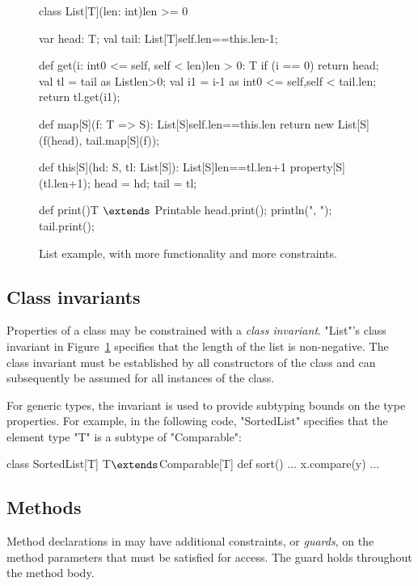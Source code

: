 \begin{figure}
{\footnotesize
\begin{xtenmathnoindent}
class List[T](len: int){len >= 0} {
  var head: T;
  val tail: List[T]{self.len==this.len-1};

  def get(i: int{0 <= self, self < len}){len > 0}: T {
    if (i == 0)
      return head;
    val tl = tail as List{len>0};
    val i1 = i-1 as int{0 <= self,self < tail.len};
    return tl.get(i1);
  }

  def map[S](f: T => S): List[S]{self.len==this.len} {
    return new List[S](f(head), tail.map[S](f));
  }

  def this[S](hd: S, tl: List[S]):
      List[S]{len==tl.len+1} {
    property[S](tl.len+1);
    head = hd; tail = tl;
  }

  def print(){T $\extends$ Printable} {
    head.print();
    println(", ");
    tail.print();
  }
}
\end{xtenmathnoindent}}
\caption{List example, with more functionality and more
constraints.}
\label{fig:list}
\end{figure}

\subsection{Class invariants}

Properties of a class may be constrained with 
a \emph{class invariant}.
\xcd"List"'s class invariant in
Figure~\ref{fig:list} specifies that the length of
the list is non-negative.
The class invariant must be established by all constructors of
the class and can subsequently be assumed for all instances of the class.

For generic types, the invariant is used to provide subtyping
bounds on the type properties.
For example, in the following code,
\xcd"SortedList" 
specifies that the element type \xcd"T"
is a subtype of \xcd"Comparable":
\begin{xtenmath}
class SortedList[T] {T$\extends$Comparable[T]} {
  def sort() { ... x.compare(y) ... }
}
\end{xtenmath}


\subsection{Methods}

Method declarations in \Xten
may have additional
constraints, or \emph{guards}, on the method parameters
that must be satisfied for access.
The guard holds throughout the method body.

